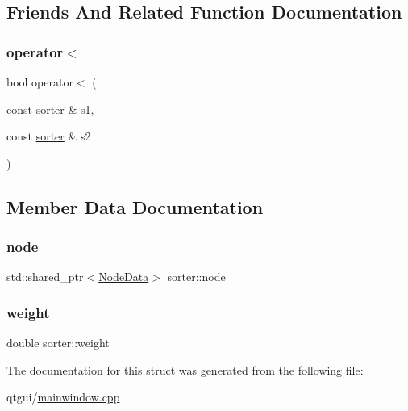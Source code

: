 \subsection{Friends And Related Function Documentation}
\mbox{\label{structsorter_a61143b150c32da936d9a5a1a60ce1c08}} 
\subsubsection{\texorpdfstring{operator$<$}{operator<}}
{\footnotesize\ttfamily bool operator$<$ (\begin{DoxyParamCaption}\item[{const \mbox{\hyperlink{structsorter}{sorter}} \&}]{s1,  }\item[{const \mbox{\hyperlink{structsorter}{sorter}} \&}]{s2 }\end{DoxyParamCaption})\hspace{0.3cm}{\ttfamily [friend]}}



\subsection{Member Data Documentation}
\mbox{\label{structsorter_abce7bdc12af3769d345b0eb748d18dc8}} 
\subsubsection{\texorpdfstring{node}{node}}
{\footnotesize\ttfamily std\+::shared\+\_\+ptr$<$\mbox{\hyperlink{class_node_data}{Node\+Data}}$>$ sorter\+::node}

\mbox{\label{structsorter_a890352ac86d3a78bad36f4fc5b25f6a9}} 
\subsubsection{\texorpdfstring{weight}{weight}}
{\footnotesize\ttfamily double sorter\+::weight}



The documentation for this struct was generated from the following file\+:\begin{DoxyCompactItemize}
\item 
qtgui/\mbox{\hyperlink{qtgui_2mainwindow_8cpp}{mainwindow.\+cpp}}\end{DoxyCompactItemize}
